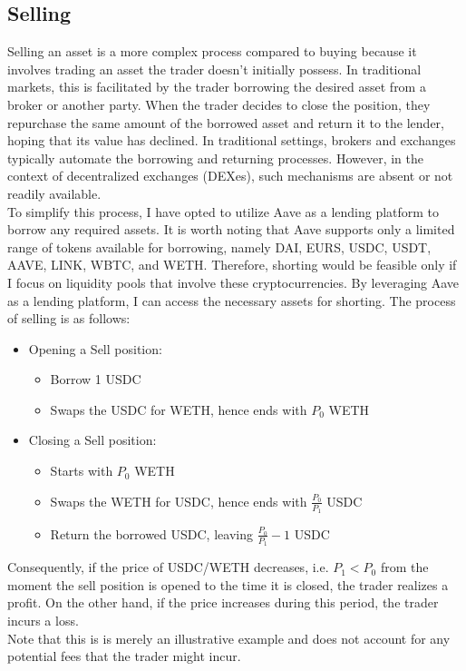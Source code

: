 \subsection{Selling}
Selling an asset is a more complex process compared to buying because it involves trading an asset the trader doesn't initially possess. In traditional markets, this is facilitated by the trader borrowing the desired asset from a broker or another party. When the trader decides to close the position, they repurchase the same amount of the borrowed asset and return it to the lender, hoping that its value has declined. In traditional settings, brokers and exchanges typically automate the borrowing and returning processes. However, in the context of decentralized exchanges (DEXes), such mechanisms are absent or not readily available.
\\[3mm]
To simplify this process, I have opted to utilize Aave as a lending platform to borrow any required assets. It is worth noting that Aave supports only a limited range of tokens available for borrowing, namely DAI, EURS, USDC, USDT, AAVE, LINK, WBTC, and WETH. Therefore, shorting would be feasible only if I focus on liquidity pools that involve these cryptocurrencies. By leveraging Aave as a lending platform, I can access the necessary assets for shorting. The process of selling is as follows:
\begin{itemize}
    \item Opening a Sell position:\begin{itemize}
        \item Borrow 1 USDC
        \item Swaps the USDC for WETH, hence ends with $P_0$ WETH
    \end{itemize}
    \item Closing a Sell position:\begin{itemize}
        \item Starts with $P_0$ WETH
        \item Swaps the WETH for USDC, hence ends with $\frac{P_0}{P_1}$ USDC
        \item Return the borrowed USDC, leaving $\frac{P_0}{P_1} - 1$ USDC
    \end{itemize}
\end{itemize}
Consequently, if the price of USDC/WETH decreases, i.e. $P_1 < P_0$ from the moment the sell position is opened to the time it is closed, the trader realizes a profit. On the other hand, if the price increases during this period, the trader incurs a loss.
\\[3mm]
Note that this is is merely an illustrative example and does not account for any potential fees that the trader might incur.


